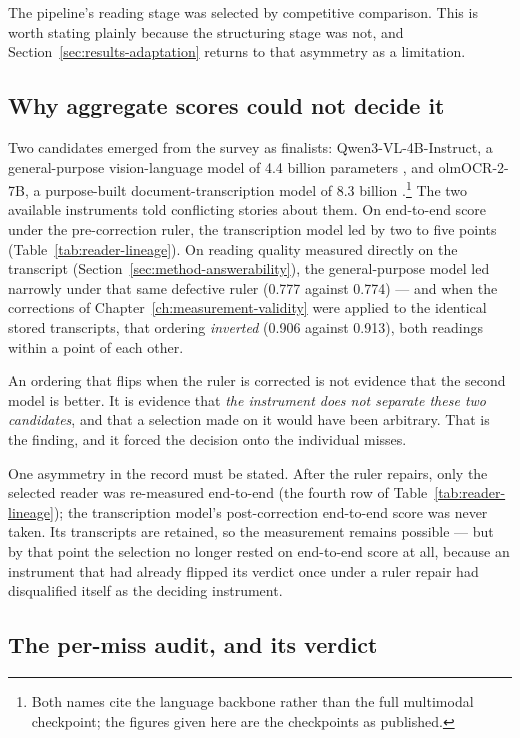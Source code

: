 The pipeline's reading stage was selected by competitive comparison. This is worth stating
plainly because the structuring stage was not, and Section~\ref{sec:results-adaptation} returns to
that asymmetry as a limitation.

\subsection{Why aggregate scores could not decide it}

Two candidates emerged from the survey as finalists: Qwen3-VL-4B-Instruct, a general-purpose
vision-language model of 4.4 billion parameters \parencite{qwen3vl}, and olmOCR-2-7B, a
purpose-built document-transcription model of 8.3 billion \parencite{olmocr2}.\footnote{Both
names cite the language backbone rather than the full multimodal checkpoint; the figures given
here are the checkpoints as published.} The two available
instruments told conflicting stories about them. On end-to-end score under the pre-correction
ruler, the transcription model led by two to five points (Table~\ref{tab:reader-lineage}). On
reading quality measured directly on the transcript (Section~\ref{sec:method-answerability}), the
general-purpose model led narrowly under that same defective ruler (0.777 against 0.774) ---
and when the corrections of Chapter~\ref{ch:measurement-validity} were applied to the
identical stored transcripts, that ordering \emph{inverted} (0.906 against 0.913), both
readings within a point of each other.

An ordering that flips when the ruler is corrected is not evidence that the second model is
better. It is evidence that \emph{the instrument does not separate these two candidates}, and
that a selection made on it would have been arbitrary. That is the finding, and it forced the
decision onto the individual misses.

One asymmetry in the record must be stated. After the ruler repairs, only the selected reader
was re-measured end-to-end (the fourth row of Table~\ref{tab:reader-lineage}); the
transcription model's post-correction end-to-end score was never taken. Its transcripts are
retained, so the measurement remains possible --- but by that point the selection no longer
rested on end-to-end score at all, because an instrument that had already flipped its verdict
once under a ruler repair had disqualified itself as the deciding instrument.



\subsection{The per-miss audit, and its verdict}

